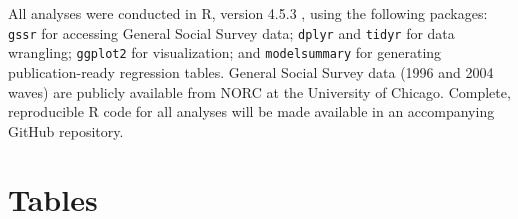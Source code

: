 \documentclass[12pt,letterpaper]{article}
\begin{document}
All analyses were conducted in R, version 4.5.3 \citep{rcoreteam2024language}, using the following packages: \texttt{gssr} \citep{healy2024gssr} for accessing General Social Survey data; \texttt{dplyr} and \texttt{tidyr} \citep{wickham2023dplyr, wickham2023tidyr} for data wrangling; \texttt{ggplot2} \citep{wickham2016ggplot2} for visualization; and \texttt{modelsummary} \citep{arel-bundock2024modelsummary} for generating publication-ready regression tables. General Social Survey data (1996 and 2004 waves) are publicly available from NORC at the University of Chicago. Complete, reproducible R code for all analyses will be made available in an accompanying GitHub repository.

\clearpage
 

\clearpage
\section*{Tables}
\end{document}
